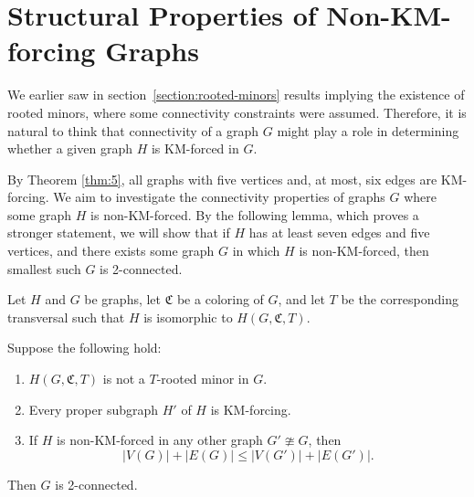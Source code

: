 \chapter{Structural Properties of Non-KM-forcing Graphs}
\label{chap:structural-properties}

We earlier saw in section~\ref{section:rooted-minors} results implying the existence of rooted minors, where some connectivity constraints were assumed.
Therefore, it is natural to think that connectivity of a graph $G$ might play a role in determining whether a given graph $H$ is KM-forced in $G$.

By Theorem \ref{thm:5}, all graphs with five vertices and, at most, six edges are KM-forcing.
We aim to investigate the connectivity properties of graphs \( G \) where some graph \( H \) is non-KM-forced.
By the following lemma, which proves a stronger statement, we will show that if \( H \) has at least seven edges and five vertices, and there exists some graph \( G \) in which \( H \) is non-KM-forced, then smallest such \( G \) is 2-connected.

\begin{lemma}
   \label{main-lemma}
 Let $H$ and $G$ be graphs, let $\mathfrak{C}$ be a coloring of $G$, and let $T$ be the corresponding transversal such that
   $H$ is isomorphic to $H(G, \mathfrak{C}, T)$.
   
 Suppose the following hold:
   \begin{enumerate}[label=(\arabic*)]
      \item $H(G, \mathfrak{C}, T)$ is not a $T$-rooted minor in $G$.
      \item Every proper subgraph $H'$ of $H$ is KM-forcing.
      \item If $H$ is non-KM-forced in any other graph $G' \ncong G$, then
     $$|V(G)| + |E(G)| \leq |V(G')| + |E(G')|.$$
   \end{enumerate}
 Then $G$ is 2-connected.
\end{lemma}
   
